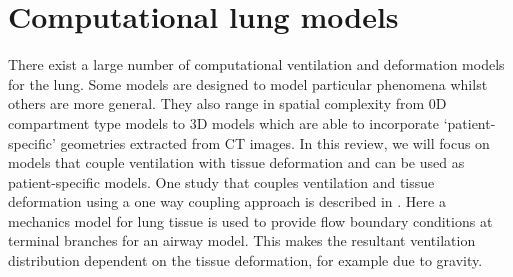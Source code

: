 \section{Computational lung models}
\label{section:review_models}
%
There exist a large number of computational ventilation and deformation models for the lung. Some models are designed to model particular phenomena whilst others are more general. They also range in spatial complexity from 0D compartment type models to 3D models which are able to incorporate `patient-specific' geometries extracted from CT images. In this review, we will focus on models that couple ventilation with tissue deformation and can be used as patient-specific models. %
%
One study that couples ventilation and tissue deformation using a one way coupling approach is described in \citet{tawhai2010image}. Here a mechanics model for lung tissue is used to provide flow boundary conditions at terminal branches for an airway model. This makes the resultant ventilation distribution dependent on the tissue deformation, for example due to gravity. 
%
%
%
%
%
